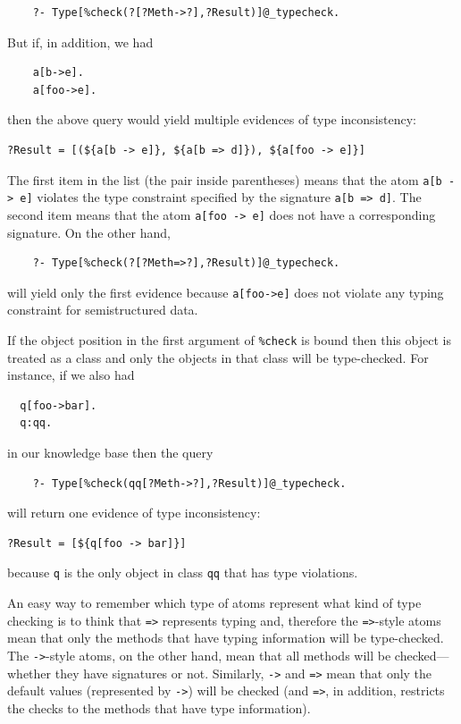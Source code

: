 \documentclass[11pt]{article}
\begin{document}
\begin{verbatim}
    ?- Type[%check(?[?Meth->?],?Result)]@_typecheck.
\end{verbatim}
But if, in addition, we had
\begin{verbatim}
    a[b->e].
    a[foo->e].
\end{verbatim}
then the above query would yield multiple evidences of type inconsistency:
\begin{verbatim}
?Result = [(${a[b -> e]}, ${a[b => d]}), ${a[foo -> e]}]
\end{verbatim}
The first item in the list (the pair inside parentheses)
means that the atom {\tt a[b -> e]} violates the type constraint
specified by the signature {\tt a[b => d]}. The second item means that the
atom {\tt a[foo -> e]} does not have a corresponding signature.
On the other hand,
\begin{verbatim}
    ?- Type[%check(?[?Meth=>?],?Result)]@_typecheck.
\end{verbatim}
will yield only the first evidence because {\tt a[foo->e]} does not violate
any typing constraint for semistructured data.

If the object position in the first argument of {\tt \%check} is bound
then this object is treated as a class and only the objects in that class
will be type-checked. For instance, if we also had
\begin{verbatim}
  q[foo->bar].
  q:qq.
\end{verbatim}
in our knowledge base then the query
\begin{verbatim}
    ?- Type[%check(qq[?Meth->?],?Result)]@_typecheck.
\end{verbatim}
will return one evidence of type inconsistency:
\begin{verbatim}
?Result = [${q[foo -> bar]}]
\end{verbatim}
because {\tt q} is the only object in class {\tt qq} that has type
violations.  

An easy way to remember which type of atoms represent what kind of type
checking is to think that {\tt =>}  represents typing and, therefore the
{\tt =>}-style atoms mean that only the methods that have typing
information will be type-checked. The {\tt ->}-style atoms, on the other
hand, mean that all methods will be checked---whether they have signatures
or not. Similarly, {\tt *->} and {\tt *=>} mean that only the default
values (represented by {\tt *->}) will be checked (and {\tt *=>}, in
addition, restricts the checks to the methods that have type information).      
\end{document}

